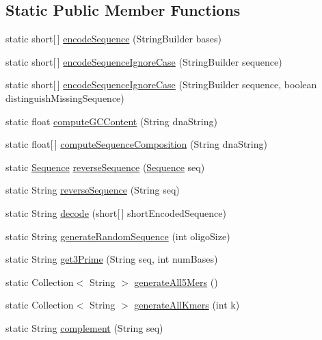 \subsection*{Static Public Member Functions}
\begin{DoxyCompactItemize}
\item 
static short\mbox{[}$\,$\mbox{]} \hyperlink{classbroad_1_1core_1_1sequence_1_1_sequence_a49b4a4a6f4ee1f9db9e36b5316c0b9d0}{encode\+Sequence} (String\+Builder bases)
\item 
static short\mbox{[}$\,$\mbox{]} \hyperlink{classbroad_1_1core_1_1sequence_1_1_sequence_a19cbe0adc947a67be346481dcc04beb3}{encode\+Sequence\+Ignore\+Case} (String\+Builder sequence)
\item 
static short\mbox{[}$\,$\mbox{]} \hyperlink{classbroad_1_1core_1_1sequence_1_1_sequence_a89e6d3a6a5de35ac099b3144eb8edcea}{encode\+Sequence\+Ignore\+Case} (String\+Builder sequence, boolean distinguish\+Missing\+Sequence)
\item 
static float \hyperlink{classbroad_1_1core_1_1sequence_1_1_sequence_a6eb5265c9cdcde2244f7c5aac6497093}{compute\+G\+C\+Content} (String dna\+String)
\item 
static float\mbox{[}$\,$\mbox{]} \hyperlink{classbroad_1_1core_1_1sequence_1_1_sequence_ae40c1d7033b0e09af85bcda1379f59c8}{compute\+Sequence\+Composition} (String dna\+String)
\item 
static \hyperlink{classbroad_1_1core_1_1sequence_1_1_sequence}{Sequence} \hyperlink{classbroad_1_1core_1_1sequence_1_1_sequence_afc286e0183b8c3dc59903224862f5ae5}{reverse\+Sequence} (\hyperlink{classbroad_1_1core_1_1sequence_1_1_sequence}{Sequence} seq)
\item 
static String \hyperlink{classbroad_1_1core_1_1sequence_1_1_sequence_a0a46eed86466309a01fef420100845e1}{reverse\+Sequence} (String seq)
\item 
static String \hyperlink{classbroad_1_1core_1_1sequence_1_1_sequence_a48b186435b91157fad3922a8e4a01d81}{decode} (short\mbox{[}$\,$\mbox{]} short\+Encoded\+Sequence)
\item 
static String \hyperlink{classbroad_1_1core_1_1sequence_1_1_sequence_a63de9839d1efc73e189632b5ede83778}{generate\+Random\+Sequence} (int oligo\+Size)
\item 
static String \hyperlink{classbroad_1_1core_1_1sequence_1_1_sequence_a961f5187cacc679ceba5a4f68d8a5e37}{get3\+Prime} (String seq, int num\+Bases)
\item 
static Collection$<$ String $>$ \hyperlink{classbroad_1_1core_1_1sequence_1_1_sequence_a36a9672e2487d0c7a9166eb8870ec650}{generate\+All5\+Mers} ()
\item 
static Collection$<$ String $>$ \hyperlink{classbroad_1_1core_1_1sequence_1_1_sequence_aef0026e345f4683e26c1cb306adb6388}{generate\+All\+Kmers} (int k)
\item 
static String \hyperlink{classbroad_1_1core_1_1sequence_1_1_sequence_ab208ef33c2a874e665a270a30a9a66b4}{complement} (String seq)
\end{DoxyCompactItemize}
